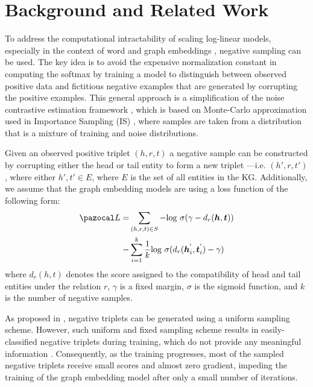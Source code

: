 \section{Background and Related Work}
\label{sec:background}
To address the computational intractability of scaling log-linear models, especially in the context of word and graph embeddings \cite{mikolov2013distributed}, negative sampling can be used. The key idea is to avoid the expensive normalization constant in computing the softmax by training a model to distinguish between observed positive data and fictitious negative examples that are generated by corrupting the positive examples. This general approach is a simplification of the noise contrastive estimation framework \cite{gutmann2010noise}, which is based on Monte-Carlo approximation used in Importance Sampling (IS) \cite{bengio2003quick}, where samples are taken from a distribution that is a mixture of training and noise distributions. 

Given an observed positive triplet $(h,r,t)$ a negative sample can be constructed by corrupting either the head or tail entity to form a new triplet ---i.e. $(h',r,t')$, where either $h',t' \in E$, where $E$ is the set of all entities in the KG.
Additionally, we assume that the graph embedding models are using a loss function of the following form:
\begin{align}
    \Lb = &\sum_{(h,r,t) \in S} -\text{log }\sigma(\gamma - d_{r}(\boldsymbol{h},\boldsymbol{t}))  \notag \\ 
    - &\sum_{i=1}^{k} \frac{1}{k}\text{log }\sigma(d_r(\boldsymbol{h}_i^{'},\boldsymbol{t}_i^{'})-\gamma)
\end{align}
where $d_r(h,t)$ denotes the score assigned to the compatibility of head and tail entities under the relation $r$, $\gamma$ is a fixed margin, $\sigma$ is the sigmoid function, and $k$ is the number of negative samples.

\label{sec:relatedwork}
As proposed in \cite{mikolov2013distributed}, negative triplets can be generated using a uniform sampling scheme. However, such uniform and fixed sampling scheme results in easily-classified negative triplets during training, which do not provide any meaningful information \cite{sun2019rotate, zhang2019nscaching}. Consequently, as the training progresses, most of the sampled negative triplets receive small scores and almost zero gradient, impeding the training of the graph embedding model after only a small number of iterations. 

